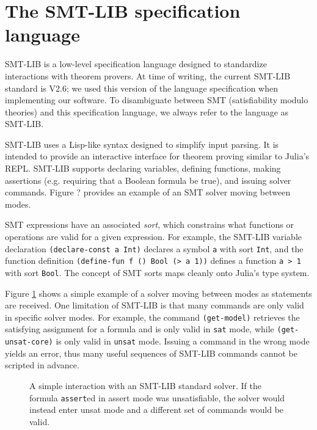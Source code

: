 \documentclass[conference]{IEEEtran}
\begin{document}
\section{The SMT-LIB specification language}
SMT-LIB is a low-level specification language designed to standardize interactions with theorem provers. At time of writing, the current SMT-LIB standard is V2.6; we used this version of the language specification when implementing our software. To disambiguate between SMT (satisfiability modulo theories) and this specification language, we always refer to the language as SMT-LIB.

SMT-LIB uses a Lisp-like syntax designed to simplify input parsing. It is intended to provide an interactive interface for theorem proving similar to Julia's REPL. SMT-LIB supports declaring variables, defining functions, making assertions (e.g. requiring that a Boolean formula be true), and issuing solver commands. Figure ? %
provides an example of an SMT solver moving between modes.

SMT expressions have an associated \textit{sort}, which constrains what functions or operations are valid for a given expression. For example, the SMT-LIB variable declaration \verb|(declare-const a Int)| declares a symbol \verb|a| with sort \verb|Int|, and the function definition \verb|(define-fun f () Bool (> a 1))| defines a function \verb|a > 1| with sort \verb|Bool|. The concept of SMT sorts maps cleanly onto Julia's type system.


Figure \ref{fig:smt-lib} shows a simple example of a solver moving between modes as statements are received.
One limitation of SMT-LIB is that many commands are only valid in specific solver modes.
For example, the command \verb|(get-model)| retrieves the satisfying assignment for a formula and is only valid in \verb|sat| mode, while \verb|(get-unsat-core)| is only valid in \verb|unsat| mode. Issuing a command in the wrong mode yields an error, thus many useful sequences of SMT-LIB commands cannot be scripted in advance.

\begin{figure}[h]
	\centering
	
	\caption{A simple interaction with an SMT-LIB standard solver. If the formula \texttt{assert}ed in assert mode was unsatisfiable, the solver would instead enter unsat mode and a different set of commands would be valid.}
	\label{fig:smt-lib}
\end{figure}
\end{document}
